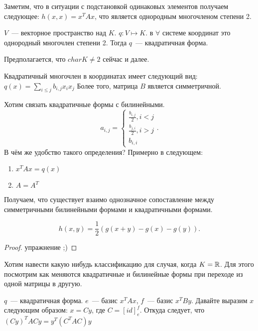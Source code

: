 \begin{remark}
    Заметим, что в ситуации с подстановкой одинаковых элементов получаем следующее:
    $h(x,x) = x^TAx$, что является однородным многочленом степени 2.
\end{remark}
\begin{definition}
    $V$~--- векторное пространство над $K$. $q\colon V\mapsto K$. 
    в $\forall$ системе координат это однородный многочлен степени 2.
    Тогда $q$~--- квадратичная форма.
\end{definition}
\begin{remark}
    Предполагается, что $char K \not= 2$ сейчас и далее.
\end{remark}
\begin{remark}
    Квадратичный многочлен в координатах имеет следующий вид:
    $q(x) = \sum\limits_{i\le j}^{}{b_{i,j} x_i x_j}$
    Более того, матрица $B$ является симметричной.
\end{remark}
\begin{remark}
    Хотим связать квадратичные формы с билинейными.
     \[
     a_{i,j} = 
     \begin{cases}
         \frac{b_{i,j}}{2}, i < j\\
         \frac{b_{j,i}}{2}, i > j\\
         b_{i,i}
     \end{cases}
    .\] 
    В чём же удобство такого определения? Примерно в следующем:
    \begin{enumerate}
        \item
            $x^TAx = q(x)$
        \item
             $A = A^T$
    \end{enumerate}
    Получаем, что существует взаимо однозначное сопоставление между
    симметричными билинейными формами и квадратичными формами.
\end{remark}
\begin{statement}
     \[
    h(x, y) = \frac{1}{2}(g(x + y) - g(x) - g(y))
    .\] 
\end{statement}
\begin{proof}
    упражнение ;)
\end{proof}
\begin{motivation}
    Хотим навести какую нибудь классификацию для случая, когда $K = \mathbb{R}$.
    Для этого посмотрим как меняются квадратичные и билинейные формы при переходе из одной матрицы в другую.
\end{motivation}
\begin{statement}
    $q$~--- квадратичная форма. $e$~--- базис $x^TAx$, $f$~--- базис $x^TBy$.
    Давайте выразим $x$ следующим образом: $x = Cy$, где $C = [id]^f_e$.
    Откуда следует, что $(Cy)^TACy = y^T(C^TAC)y$
\end{statement}
